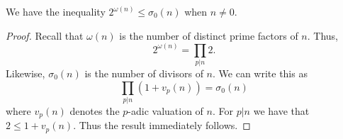 \begin{theorem}
\label{two_pow_omega_le_sigma_zero}
\leanok
We have the inequality $2^{\omega(n)}\leq\sigma_0(n)$ when $n\neq 0$.
\end{theorem}
\begin{proof}
\leanok
Recall that $\omega(n)$ is the number of distinct prime factors of $n$. Thus,
    $$2^{\omega(n)}=\prod_{p|n}2.$$
    Likewise, $\sigma_0(n)$ is the number of divisors of $n$. We can write this as
    $$\prod_{p|n}(1+v_p(n))=\sigma_0(n)$$
    where $v_p(n)$ denotes the $p$-adic valuation of $n$. For $p|n$ we have that $2\leq 1+v_p(n)$.
    Thus the result immediately follows.
\end{proof}
